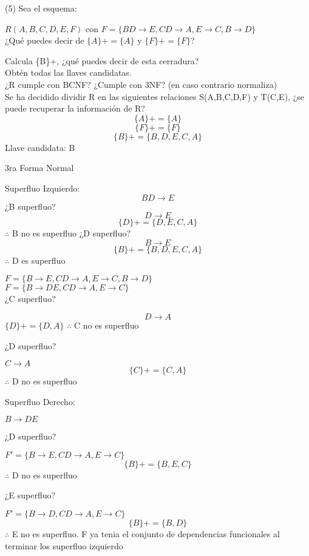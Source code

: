 \documentclass{article}
\begin{document}
    \item[(5)] Sea el esquema:

    $R(A,B,C,D,E,F)$ con $F=\{BD \rightarrow E, CD \rightarrow A, E \rightarrow C, B \rightarrow D\}$\\
    ¿Qué puedes decir de $\{A\}+ = \{A\}$ y $\{F\}+=\{F\}$?

    Calcula \{B\}+, ¿qué puedes decir de esta cerradura?\\
    Obtén todas las llaves candidatas.\\
    ¿R cumple con BCNF? ¿Cumple con 3NF? (en caso contrario normaliza)\\
    Se ha decidido dividir R en las siguientes relaciones S(A,B,C,D,F) y T(C,E), ¿se puede recuperar la
    información de R?
    $$\{ A\}+=\{ A\}$$
    $$\{ F\}+=\{ F\}$$
    $$\{ B\}+=\{ B,D,E,C,A\}$$
    Llave candidata: B

    3ra Forma Normal

    Superfluo Izquierdo:
    $$BD \rightarrow E$$
    ¿B superfluo?
    $$D\rightarrow E$$
    $$\{ D\}+=\{ D,E,C,A\}$$
    $\therefore$ B no es superfluo
    ¿D superfluo?
    $$B\rightarrow E$$
    $$\{ B\}+=\{ B,D,E,C,A\}$$
    $\therefore$ D es superfluo

    $F=\{B \rightarrow E, CD \rightarrow A, E \rightarrow C, B\rightarrow D\}$\\
    $F=\{B \rightarrow DE, CD \rightarrow A, E \rightarrow C\}$\\

    ¿C superfluo?

    $$D\rightarrow A$$
    $\{ D\}+=\{ D,A\}$
    $\therefore$ C no es superfluo

    ¿D superfluo?

    $C \rightarrow A$
    $$\{ C\}+=\{ C,A\}$$
    $\therefore$ D no es superfluo

    Superfluo Derecho:

    $B \rightarrow DE$

    ¿D superfluo?

    $F'=\{B \rightarrow E, CD \rightarrow A, E\rightarrow C\}$\\
    $$\{ B\}+=\{ B,E,C\}$$
    $\therefore$ D no es superfluo

    ¿E superfluo?

    $F'=\{ B \rightarrow D, CD \rightarrow A, E \rightarrow C\}$\\
    $$\{ B\}+=\{ B,D\}$$
    $\therefore$ E no es superfluo.
    F ya tenia el conjunto de dependencias funcionales al terminar los superfluo izquierdo\\
\end{document}
